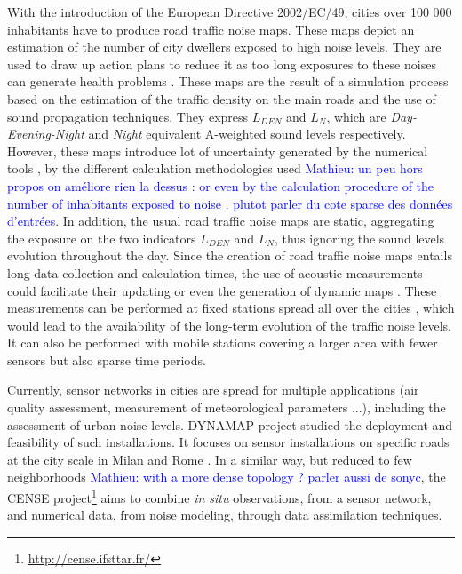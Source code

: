 \documentclass[twocolumn,a4paper,10pt]{article}
\newcommand{\ml}[1]{\textcolor{blue}{ Mathieu: #1}}
\begin{document}
With the introduction of the European Directive 2002/EC/49, cities over 100 000 inhabitants have to produce road traffic noise maps. These maps depict an estimation of the number of city dwellers exposed to high noise levels. They are used to draw up action plans to reduce it as too long exposures to these noises can generate health problems \cite{who_burden_2017}. These maps are the result of a simulation process based on the estimation of the traffic density on the main roads and the use of sound propagation techniques. They express $L_ {DEN}$ and $L_N$, which are \textit{Day-Evening-Night} and \textit{Night} equivalent A-weighted sound levels respectively. However, these maps introduce lot of uncertainty generated by the numerical tools \cite{van_leeuwen_noise_2015}, by the different calculation methodologies used \cite{leroy_uncertainty_2010}\cite{garg_critical_2014} \ml{un peu hors propos on améliore rien la dessus : or even by the calculation procedure of the number of inhabitants exposed to noise \cite{king_implementation_2011}. plutot parler du cote sparse des données d'entrées}. In addition, the usual road traffic noise maps are static, aggregating the exposure on the two indicators $L_{DEN}$ and $L_N$, thus ignoring the sound levels evolution throughout the day. Since the creation of road traffic noise maps entails long data collection and calculation times, the use of acoustic measurements could facilitate their updating or even the generation of dynamic maps \cite{wei_dynamic_2016}. These measurements can be performed at fixed stations spread all over the cities \cite{Mioduszewski} \cite{mietlicki2012innovative}, which would lead to the availability of the long-term evolution of the traffic noise levels. It can also be performed with  mobile stations \cite{can_exploring_2012} \cite{manvell2004sadmam} covering a larger area with fewer sensors but also sparse time periods.

Currently, sensor networks in cities are spread for multiple applications (air quality assessment, measurement of meteorological parameters ...), including the assessment of urban noise levels. DYNAMAP project \cite{dynamap_2016} studied the deployment and feasibility of such installations. It focuses on sensor installations on specific roads at the city scale in Milan and Rome \cite{bellucci_life_2017}. In a similar way, but reduced to few neighborhoods \ml{with a more dense topology ? parler aussi de sonyc}, the CENSE project\footnote{\url{http://cense.ifsttar.fr/}} \cite{picaut2017characterization} aims to combine \textit{in situ} observations, from a sensor network, and numerical data, from noise modeling, through data assimilation techniques.
\end{document}
